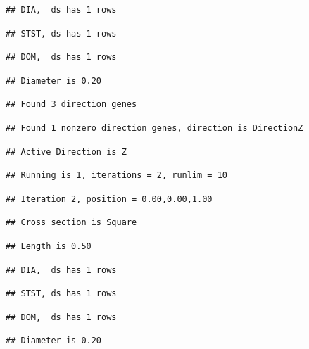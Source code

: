 \documentclass[]{article}
\begin{document}
\begin{verbatim}
## DIA,  ds has 1 rows
\end{verbatim}

\begin{verbatim}
## STST, ds has 1 rows
\end{verbatim}

\begin{verbatim}
## DOM,  ds has 1 rows
\end{verbatim}

\begin{verbatim}
## Diameter is 0.20
\end{verbatim}

\begin{verbatim}
## Found 3 direction genes
\end{verbatim}

\begin{verbatim}
## Found 1 nonzero direction genes, direction is DirectionZ
\end{verbatim}

\begin{verbatim}
## Active Direction is Z
\end{verbatim}

\begin{verbatim}
## Running is 1, iterations = 2, runlim = 10
\end{verbatim}

\begin{verbatim}
## Iteration 2, position = 0.00,0.00,1.00
\end{verbatim}

\begin{verbatim}
## Cross section is Square
\end{verbatim}

\begin{verbatim}
## Length is 0.50
\end{verbatim}

\begin{verbatim}
## DIA,  ds has 1 rows
\end{verbatim}

\begin{verbatim}
## STST, ds has 1 rows
\end{verbatim}

\begin{verbatim}
## DOM,  ds has 1 rows
\end{verbatim}

\begin{verbatim}
## Diameter is 0.20
\end{verbatim}
\end{document}
